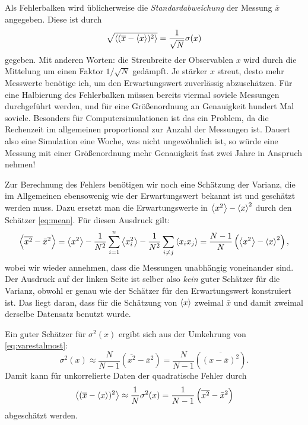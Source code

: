 Als Fehlerbalken wird üblicherweise die \emph{Standardabweichung} der
Messung $\overline{x}$ angegeben. Diese ist durch
\begin{equation}
  \sqrt{\left\langle{(\overline{x} - \left\langle{x}\right\rangle)^2}\right\rangle}
  = \frac{1}{\sqrt{N}}\sigma(x)
\end{equation}
gegeben. Mit anderen Worten: die Streubreite der Observablen $x$ wird
durch die Mittelung um einen Faktor $1/\sqrt{N}$ gedämpft. Je stärker
$x$ streut, desto mehr Messwerte benötige ich, um den Erwartungswert
zuverlässig abzuschätzen. Für eine Halbierung des Fehlerbalken müssen
bereits viermal soviele Messungen durchgeführt werden, und für eine
Größenordnung an Genauigkeit hundert Mal soviele. Besonders für
Computersimulationen ist das ein Problem, da die Rechenzeit im
allgemeinen proportional zur Anzahl der Messungen ist. Dauert also
eine Simulation eine Woche, was nicht ungewöhnlich ist, so würde eine
Messung mit einer Größenordnung mehr Genauigkeit fast zwei Jahre in
Anspruch nehmen!

Zur Berechnung des Fehlers benötigen wir noch eine Schätzung der
Varianz, die im Allgemeinen ebensowenig wie der Erwartungswert bekannt
ist und geschätzt werden muss. Dazu ersetzt man die Erwartungswerte in
$\left\langle{x^2}\right\rangle - \left\langle{x}\right\rangle^2$ durch den Schätzer \eqref{eq:mean}. Für
diesen Ausdruck gilt:
\begin{equation}
  \label{eq:varestalmost}
  \left\langle{\overline{x^2} - \bar{x}^2}\right\rangle
  = \left\langle{x^2}\right\rangle - 
  \frac{1}{N^2}\sum_{i=1}^n \left\langle{x_i^2}\right\rangle
  - \frac{1}{N^2}\sum_{i\neq j} \left\langle{x_ix_j}\right\rangle
  = \frac{N-1}{N}\left(\left\langle{x^2}\right\rangle - \left\langle{x}\right\rangle^2\right),
\end{equation}
wobei wir wieder annehmen, dass die Messungen unabhängig voneinander
sind. Der Ausdruck auf der linken Seite ist selber also \emph{kein} guter
Schätzer für die Varianz, obwohl er genau wie der Schätzer für den
Erwartungswert konstruiert ist. Das liegt daran, dass für die Schätzung
von $\left\langle{x}\right\rangle$ zweimal $\bar{x}$ und damit zweimal derselbe
Datensatz benutzt wurde.

Ein guter Schätzer für $\sigma^2(x)$ ergibt sich aus der Umkehrung von
\eqref{eq:varestalmost}:
\begin{equation}
  \label{eq:varest}
  \sigma^2(x) \approx \frac{N}{N-1}\left(\overline{x^2} -
    \bar{x}^2\right)
  = \frac{N}{N-1}\left(\overline{(x -
      \bar{x})^2}\right).
\end{equation}
Damit kann für unkorrelierte Daten der quadratische Fehler durch
\begin{equation}
  \label{eq:esterr}
  \left\langle{(\overline{x} - \left\langle{x}\right\rangle)^2}\right\rangle
  \approx \frac{1}{N}\sigma^2(x)
  = \frac{1}{N-1}\left(\overline{x^2} - \bar{x}^2\right)
\end{equation}
abgeschätzt werden.

